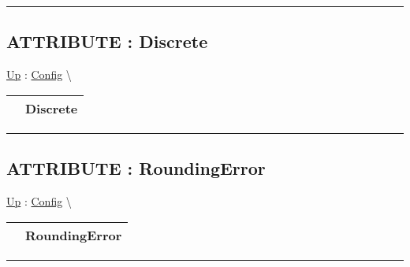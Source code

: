 \rule{\linewidth}{0.5pt}
\subsection*{ATTRIBUTE : Discrete}
\hypertarget{ecldoc:ml_core.config.discrete}{}
\hyperlink{ecldoc:ML_Core.Config}{Up} :
\hspace{0pt} \hyperlink{ecldoc:ML_Core.Config}{Config} \textbackslash 

{\renewcommand{\arraystretch}{1.5}
\begin{tabularx}{\textwidth}{|>{\raggedright\arraybackslash}l|X|}
\hline
\hspace{0pt} & Discrete \\
\hline
\end{tabularx}
}

\par


\rule{\linewidth}{0.5pt}
\subsection*{ATTRIBUTE : RoundingError}
\hypertarget{ecldoc:ml_core.config.roundingerror}{}
\hyperlink{ecldoc:ML_Core.Config}{Up} :
\hspace{0pt} \hyperlink{ecldoc:ML_Core.Config}{Config} \textbackslash 

{\renewcommand{\arraystretch}{1.5}
\begin{tabularx}{\textwidth}{|>{\raggedright\arraybackslash}l|X|}
\hline
\hspace{0pt} & RoundingError \\
\hline
\end{tabularx}
}

\par


\rule{\linewidth}{0.5pt}


